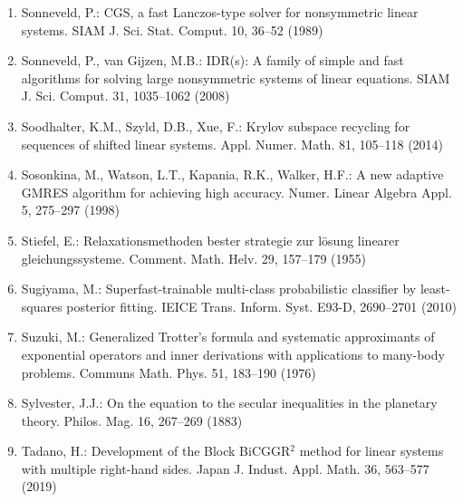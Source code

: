 \begin{enumerate}[label=\arabic*.,ref=\arabic*,leftmargin=3em]
\item\label{bib:source-173}Sonneveld, P.: CGS, a fast Lanczos-type solver for nonsymmetric linear systems. SIAM J. Sci. Stat. Comput. 10, 36–52 (1989)

\item\label{bib:source-174}Sonneveld, P., van Gijzen, M.B.: IDR(s): A family of simple and fast algorithms for solving large nonsymmetric systems of linear equations. SIAM J. Sci. Comput. 31, 1035–1062 (2008)

\item\label{bib:source-175}Soodhalter, K.M., Szyld, D.B., Xue, F.: Krylov subspace recycling for sequences of shifted linear systems. Appl. Numer. Math. 81, 105–118 (2014)

\item\label{bib:source-176}Sosonkina, M., Watson, L.T., Kapania, R.K., Walker, H.F.: A new adaptive GMRES algorithm for achieving high accuracy. Numer. Linear Algebra Appl. 5, 275–297 (1998)

\item\label{bib:source-177}Stiefel, E.: Relaxationsmethoden bester strategie zur lösung linearer gleichungssysteme. Comment. Math. Helv. 29, 157–179 (1955)

\item\label{bib:source-178}Sugiyama, M.: Superfast-trainable multi-class probabilistic classifier by least-squares posterior fitting. IEICE Trans. Inform. Syst. E93-D, 2690–2701 (2010)

\item\label{bib:source-179}Suzuki, M.: Generalized Trotter’s formula and systematic approximants of exponential operators and inner derivations with applications to many-body problems. Communs Math. Phys. 51, 183–190 (1976)

\item\label{bib:source-180}Sylvester, J.J.: On the equation to the secular inequalities in the planetary theory. Philos. Mag. 16, 267–269 (1883)

\item\label{bib:source-181}Tadano, H.: Development of the Block BiCGGR$^2$ method for linear systems with multiple right-hand sides. Japan J. Indust. Appl. Math. 36, 563–577 (2019)


\end{enumerate}
